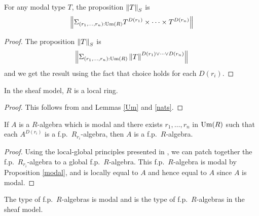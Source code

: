     \begin{proposition}\label{norm}
      For any modal type $T$, the proposition $\left\lVert T \right\rVert_S$ is
      $$\left\lVert \Sigma_{(r_1,\dots,r_n):\mathrm{Um}(R)}T^{D(r_1)}\times\dots\times T^{D(r_n)} \right\rVert$$
    \end{proposition}
    
    \begin{proof}
      The proposition $\left\lVert T \right\rVert_S$ is
      $$\left\lVert \Sigma_{(r_1,\dots,r_n):\mathrm{Um}(R)}\left\lVert T \right\rVert^{D(r_1)\vee\dots\vee D(r_n)} \right\rVert$$
      and we get the result using the fact that choice holds for each $D(r_i)$.
    \end{proof}
    
    \begin{proposition}
      In the sheaf model, $R$ is a local ring.
    \end{proposition}

    \begin{proof}
      This follows from  and Lemmas \ref{Um} and \ref{nats}.
    \end{proof}

    \begin{lemma}\label{localfp}
      If $A$ is a $R$-algebra which is modal and there exists $r_1,\dots,r_n$ in $\mathrm{Um}(R)$ such that each
      $A^{D(r_i)}$ is a f.p.\ $R_{r_i}$-algebra, then $A$ is a f.p.\ $R$-algebra.
    \end{lemma}
    
    \begin{proof}
      Using the local-global principles presented in \cite{lombardi-quitte}, we can patch together the f.p.\ $R_{r_i}$-algebra
      to a global f.p.\ $R$-algebra. This f.p.\ $R$-algebra is modal by Proposition \ref{modal}, and is locally equal to $A$
      and hence equal to $A$ since $A$ is modal.
    \end{proof}

    \begin{corollary}
      The type of f.p.\ $R$-algebras is modal and is the type of f.p.\ $R$-algebras in the sheaf model.
    \end{corollary}

